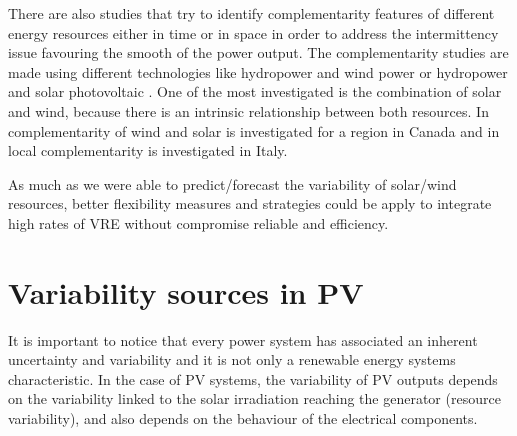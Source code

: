 
There are also studies that try to identify complementarity features of different energy resources either in time or in space in order to address the intermittency issue favouring the smooth of the power output. The complementarity studies are made using different technologies like hydropower and wind power \cite*{Denault2009, Silva2016} or hydropower and solar photovoltaic \cite*{Francois2016, Beluco2012, Kougias2016}. One of the most investigated is the combination of solar and wind, because there is an intrinsic relationship between both resources. In \cite*{Hoicka2011} complementarity of wind and solar is investigated for a region in Canada and in \cite*{Monforti2014} local complementarity is investigated in Italy.


As much as we were able to predict/forecast the variability of solar/wind resources, better flexibility measures and strategies could be apply to integrate high rates of VRE without compromise reliable and efficiency. 
\section{Variability sources in PV}

It is important to notice that every power system has associated an inherent uncertainty and variability and it is not only a renewable energy systems characteristic. In the case of PV systems, the variability of PV outputs depends on the variability linked to the solar irradiation reaching the generator (resource variability), and also depends on the behaviour of the electrical components.  


